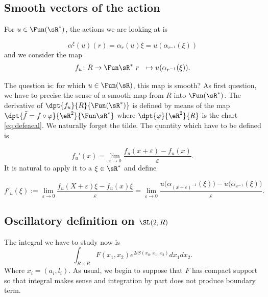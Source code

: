 \subsection{Smooth vectors of the action}

For $u\in \Fun(\sR^*)$, the actions we are looking at is

\[
	\alpha^{\xi}(u)(r)=\alpha_r(u)\xi=u(\alpha_{r^{-1}}(\xi))
\]
and we consider the map
\begin{equation}
	\begin{aligned}
		f_u \colon R & \to \Fun\sR^*\
		r            & \mapsto u(\alpha_{r^{-1}}(\xi)).
	\end{aligned}
\end{equation}

The question is: for which $u\in\Fun(\sR)$, this map is smooth? As first question, we have to precise the sense of a smooth map from $R$ into $\Fun(\sR^*)$. The derivative of $\dpt{f_u}{R}{\Fun(\sR^*)}$ is defined by means of the map $\dpt{\tilde f=f\circ\varphi}{\eR^2}{\Fun\sR^*}$ where $\dpt{\varphi}{\eR^2}{R}$ is the chart \eqref{eq:defeaeal}. We naturally forget the tilde. The quantity which have to be defined is


\[
	f_u'(x)=\lim_{\varepsilon\to 0}\frac{f_u(x+\varepsilon)-f_u(x)}{\varepsilon}.
\]
It is natural to apply it to a $\xi\in\sR^*$ and define

\begin{equation}
	f'_u(\xi):=\lim_{\varepsilon\to 0}\frac{f_u(X+\varepsilon)\xi-f_u(x)\xi}{\varepsilon}
	=\lim_{\varepsilon\to 0}\frac{u\big( \alpha_{(x+\varepsilon)^{-1}}(\xi) \big)-u\big( \alpha_{x^{-1}}(\xi) \big)}{\varepsilon}.
\end{equation}



\subsection{Oscillatory definition on \texorpdfstring{$\SL(2,R)$}{SL2R}}  \label{subsec:Oscdefsl}

The integral we have to study now is
\[
	\int_{R\times R} F(x_1,x_2) e^{2iS(x_0,x_1,x_2)}dx_1dx_2.
\]
Where $x_i=(a_i,l_i)$. As usual, we begin to suppose that $F$ has compact support so that integral makes sense and integration by part does not produce boundary term.

